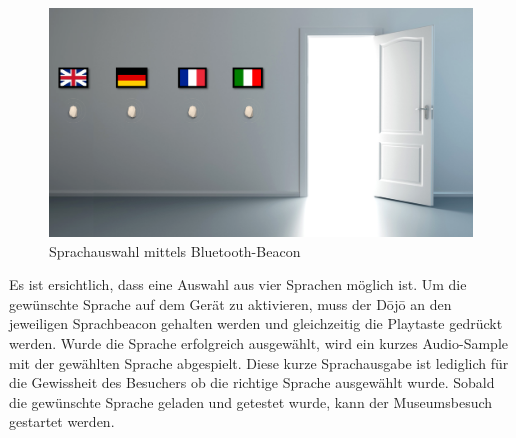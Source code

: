 \begin{figure}[H]
	\begin{center}
		\includegraphics[width=140mm]{data/BeaconSpracherkennung.png}
		\caption[Sprachauswahl mittels Bluetooth-Beacon]{Sprachauswahl mittels Bluetooth-Beacon} %
		\label{fig:SprachauswahlBeacon}
	\end{center}
\end{figure}

Es ist ersichtlich, dass eine Auswahl aus vier Sprachen möglich ist. Um die gewünschte Sprache auf dem Gerät zu aktivieren, muss der Dōjō an den jeweiligen Sprachbeacon gehalten werden und gleichzeitig die Playtaste gedrückt werden. Wurde die Sprache erfolgreich ausgewählt, wird ein kurzes Audio-Sample mit der gewählten Sprache abgespielt. Diese kurze Sprachausgabe ist lediglich für die Gewissheit des Besuchers ob die richtige Sprache ausgewählt wurde. Sobald die gewünschte Sprache geladen und getestet wurde, kann der Museumsbesuch gestartet werden.
